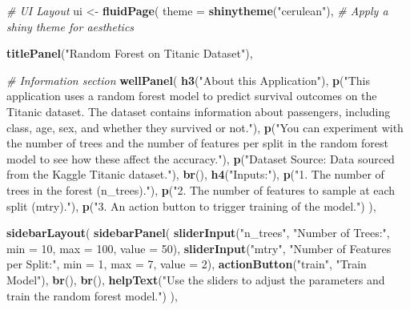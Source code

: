 \documentclass[
]{article}
\newenvironment{Shaded}{\begin{snugshade}}{\end{snugshade}}
\newcommand{\AttributeTok}[1]{\textcolor[rgb]{0.13,0.29,0.53}{#1}}
\newcommand{\CommentTok}[1]{\textcolor[rgb]{0.56,0.35,0.01}{\textit{#1}}}
\newcommand{\DecValTok}[1]{\textcolor[rgb]{0.00,0.00,0.81}{#1}}
\newcommand{\FunctionTok}[1]{\textcolor[rgb]{0.13,0.29,0.53}{\textbf{#1}}}
\newcommand{\NormalTok}[1]{#1}
\newcommand{\OtherTok}[1]{\textcolor[rgb]{0.56,0.35,0.01}{#1}}
\newcommand{\StringTok}[1]{\textcolor[rgb]{0.31,0.60,0.02}{#1}}
\begin{document}
\begin{Shaded}
\begin{Highlighting}[]
\CommentTok{\# UI Layout}
\NormalTok{ui }\OtherTok{\textless{}{-}} \FunctionTok{fluidPage}\NormalTok{(}
  \AttributeTok{theme =} \FunctionTok{shinytheme}\NormalTok{(}\StringTok{"cerulean"}\NormalTok{),  }\CommentTok{\# Apply a shiny theme for aesthetics}
  
  \FunctionTok{titlePanel}\NormalTok{(}\StringTok{"Random Forest on Titanic Dataset"}\NormalTok{),}
  
  \CommentTok{\# Information section}
  \FunctionTok{wellPanel}\NormalTok{(}
    \FunctionTok{h3}\NormalTok{(}\StringTok{"About this Application"}\NormalTok{),}
    \FunctionTok{p}\NormalTok{(}\StringTok{"This application uses a random forest model to predict survival outcomes on the Titanic dataset. The dataset contains information about passengers, including class, age, sex, and whether they survived or not."}\NormalTok{),}
    \FunctionTok{p}\NormalTok{(}\StringTok{"You can experiment with the number of trees and the number of features per split in the random forest model to see how these affect the accuracy."}\NormalTok{),}
    \FunctionTok{p}\NormalTok{(}\StringTok{"Dataset Source: Data sourced from the Kaggle Titanic dataset."}\NormalTok{),}
    \FunctionTok{br}\NormalTok{(),}
    \FunctionTok{h4}\NormalTok{(}\StringTok{"Inputs:"}\NormalTok{),}
    \FunctionTok{p}\NormalTok{(}\StringTok{"1. The number of trees in the forest (n\_trees)."}\NormalTok{),}
    \FunctionTok{p}\NormalTok{(}\StringTok{"2. The number of features to sample at each split (mtry)."}\NormalTok{),}
    \FunctionTok{p}\NormalTok{(}\StringTok{"3. An action button to trigger training of the model."}\NormalTok{)}
\NormalTok{  ),}
  
  \FunctionTok{sidebarLayout}\NormalTok{(}
    \FunctionTok{sidebarPanel}\NormalTok{(}
      \FunctionTok{sliderInput}\NormalTok{(}\StringTok{"n\_trees"}\NormalTok{, }\StringTok{"Number of Trees:"}\NormalTok{, }\AttributeTok{min =} \DecValTok{10}\NormalTok{, }\AttributeTok{max =} \DecValTok{100}\NormalTok{, }\AttributeTok{value =} \DecValTok{50}\NormalTok{),}
      \FunctionTok{sliderInput}\NormalTok{(}\StringTok{"mtry"}\NormalTok{, }\StringTok{"Number of Features per Split:"}\NormalTok{, }\AttributeTok{min =} \DecValTok{1}\NormalTok{, }\AttributeTok{max =} \DecValTok{7}\NormalTok{, }\AttributeTok{value =} \DecValTok{2}\NormalTok{),}
      \FunctionTok{actionButton}\NormalTok{(}\StringTok{"train"}\NormalTok{, }\StringTok{"Train Model"}\NormalTok{),}
      \FunctionTok{br}\NormalTok{(),}
      \FunctionTok{br}\NormalTok{(),}
      \FunctionTok{helpText}\NormalTok{(}\StringTok{"Use the sliders to adjust the parameters and train the random forest model."}\NormalTok{)}
\NormalTok{    ),}
    

\end{Highlighting}
\end{Shaded}
\end{document}
